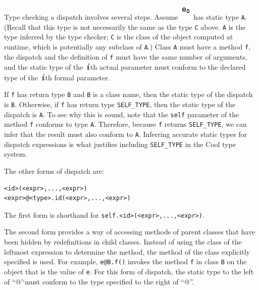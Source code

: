 \documentclass[]{article}
\begin{document}
Type checking a dispatch involves several steps. Assume
\includegraphics{img19.png} has static type \texttt{A}. (Recall that
this type is not necessarily the same as the type \texttt{C} above.
\texttt{A} is the type inferred by the type checker; \texttt{C} is the
class of the object computed at runtime, which is potentially any
subclass of \texttt{A}.) Class \texttt{A} must have a method \texttt{f},
the dispatch and the definition of \texttt{f} must have the same number
of arguments, and the static type of the \includegraphics{img20.png}th
actual parameter must conform to the declared type of the
\includegraphics{img20.png}th formal parameter.

If \texttt{f} has return type \texttt{B} and \texttt{B} is a class name,
then the static type of the dispatch is \texttt{B}. Otherwise, if
\texttt{f} has return type \texttt{SELF\_TYPE}, then the static type of
the dispatch is \texttt{A}. To see why this is sound, note that the
\texttt{self} parameter of the method \texttt{f} conforms to type
\texttt{A}. Therefore, because \texttt{f} returns \texttt{SELF\_TYPE},
we can infer that the result must also conform to \texttt{A}. Inferring
accurate static types for dispatch expressions is what justifies
including \texttt{SELF\_TYPE} in the Cool type system.

The other forms of dispatch are:

\begin{verbatim}
<id>(<expr>,...,<expr>)
<expr>@<type>.id(<expr>,...,<expr>)
\end{verbatim}

The first form is shorthand for
\texttt{self.\textless{}id\textgreater{}(\textless{}expr\textgreater{},...,\textless{}expr\textgreater{})}.

The second form provides a way of accessing methods of parent classes
that have been hidden by redefinitions in child classes. Instead of
using the class of the leftmost expression to determine the method, the
method of the class explicitly specified is used. For example,
\texttt{e@B.f()} invokes the method \texttt{f} in class \texttt{B} on
the object that is the value of \texttt{e}. For this form of dispatch,
the static type to the left of ``@'`must conform to the type specified
to the right of ``@''.
\end{document}

